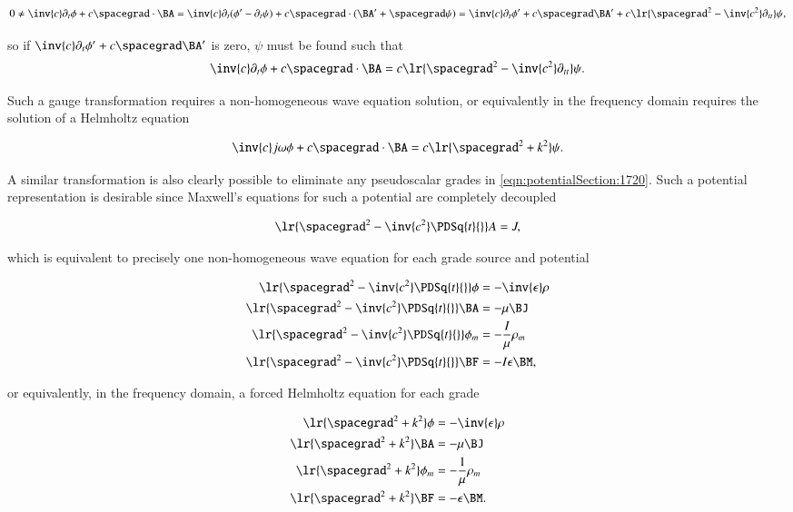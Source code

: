 \begin{dmath}\label{eqn:potentialSection:1680}
0 \ne
\inv{c} \partial_t \phi + c \spacegrad \cdot \BA
=
\inv{c} \partial_t (\phi' - \partial_t \psi) + c \spacegrad \cdot (\BA' + \spacegrad \psi)
=
\inv{c} \partial_t \phi' + c \spacegrad \BA'
+ c \lr{ \spacegrad^2 - \inv{c^2} \partial_{tt} } \psi,
\end{dmath}

so if \( \inv{c} \partial_t \phi' + c \spacegrad \BA' \) is zero, \( \psi \) must be found such that
\begin{dmath}\label{eqn:potentialSection:1700}
\inv{c} \partial_t \phi + c \spacegrad \cdot \BA
= c \lr{ \spacegrad^2 - \inv{c^2} \partial_{tt} } \psi.
\end{dmath}

Such a gauge transformation requires a non-homogeneous wave equation solution, or equivalently in the frequency domain requires the solution of a Helmholtz equation

\begin{dmath}\label{eqn:potentialSection:1740}
\inv{c} j \omega \phi + c \spacegrad \cdot \BA
= c \lr{ \spacegrad^2 + k^2 } \psi.
\end{dmath}

A similar transformation is also clearly possible to eliminate any pseudoscalar grades in \cref{eqn:potentialSection:1720}.
Such a potential representation is desirable since
Maxwell's equations for such a potential are completely decoupled

\begin{dmath}\label{eqn:potentialSection:1760}
\lr{ \spacegrad^2 - \inv{c^2} \PDSq{t}{} } A = J,
\end{dmath}

which is equivalent to precisely one non-homogeneous wave equation for each grade source and potential

\begin{dmath}\label{eqn:potentialSection:1600}
\begin{aligned}
\lr{ \spacegrad^2 - \inv{c^2} \PDSq{t}{} } \phi &= - \inv{\epsilon} \rho \\
\lr{ \spacegrad^2 - \inv{c^2} \PDSq{t}{} } \BA &= - \mu \BJ \\
\lr{ \spacegrad^2 - \inv{c^2} \PDSq{t}{} } \phi_m &= - \frac{I}{\mu} \rho_m \\
\lr{ \spacegrad^2 - \inv{c^2} \PDSq{t}{} } \BF &= - I \epsilon \BM,
\end{aligned}
\end{dmath}

or equivalently, in the frequency domain, a forced Helmholtz equation for each grade

\begin{dmath}\label{eqn:potentialSection:1780}
\begin{aligned}
\lr{ \spacegrad^2 + k^2 } \phi &= - \inv{\epsilon} \rho \\
\lr{ \spacegrad^2 + k^2 } \BA &= - \mu \BJ \\
\lr{ \spacegrad^2 + k^2 } \phi_m &= - \frac{1}{\mu} \rho_m \\
\lr{ \spacegrad^2 + k^2 } \BF &= - \epsilon \BM.
\end{aligned}
\end{dmath}

